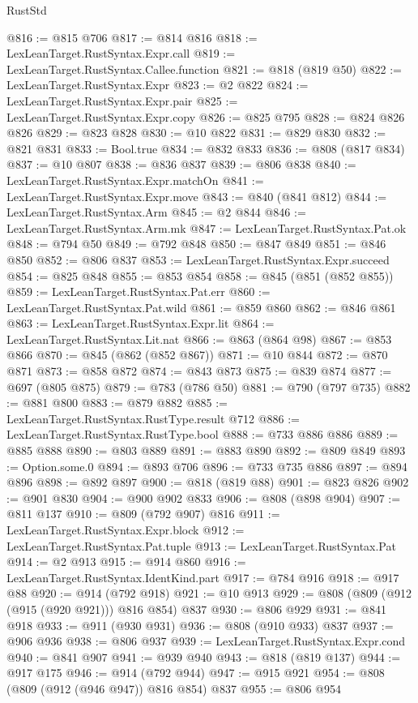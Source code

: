 \begin{lexlean}{RustStd}
\begin{coremodule}
@816 := @815 @706
@817 := @814 @816
@818 := LexLeanTarget.RustSyntax.Expr.call
@819 := LexLeanTarget.RustSyntax.Callee.function
@821 := @818 (@819 @50)
@822 := LexLeanTarget.RustSyntax.Expr
@823 := @2 @822
@824 := LexLeanTarget.RustSyntax.Expr.pair
@825 := LexLeanTarget.RustSyntax.Expr.copy
@826 := @825 @795
@828 := @824 @826 @826
@829 := @823 @828
@830 := @10 @822
@831 := @829 @830
@832 := @821 @831
@833 := Bool.true
@834 := @832 @833
@836 := @808 (@817 @834)
@837 := @10 @807
@838 := @836 @837
@839 := @806 @838
@840 := LexLeanTarget.RustSyntax.Expr.matchOn
@841 := LexLeanTarget.RustSyntax.Expr.move
@843 := @840 (@841 @812)
@844 := LexLeanTarget.RustSyntax.Arm
@845 := @2 @844
@846 := LexLeanTarget.RustSyntax.Arm.mk
@847 := LexLeanTarget.RustSyntax.Pat.ok
@848 := @794 @50
@849 := @792 @848
@850 := @847 @849
@851 := @846 @850
@852 := @806 @837
@853 := LexLeanTarget.RustSyntax.Expr.succeed
@854 := @825 @848
@855 := @853 @854
@858 := @845 (@851 (@852 @855))
@859 := LexLeanTarget.RustSyntax.Pat.err
@860 := LexLeanTarget.RustSyntax.Pat.wild
@861 := @859 @860
@862 := @846 @861
@863 := LexLeanTarget.RustSyntax.Expr.lit
@864 := LexLeanTarget.RustSyntax.Lit.nat
@866 := @863 (@864 @98)
@867 := @853 @866
@870 := @845 (@862 (@852 @867))
@871 := @10 @844
@872 := @870 @871
@873 := @858 @872
@874 := @843 @873
@875 := @839 @874
@877 := @697 (@805 @875)
@879 := @783 (@786 @50)
@881 := @790 (@797 @735)
@882 := @881 @800
@883 := @879 @882
@885 := LexLeanTarget.RustSyntax.RustType.result @712
@886 := LexLeanTarget.RustSyntax.RustType.bool
@888 := @733 @886 @886
@889 := @885 @888
@890 := @803 @889
@891 := @883 @890
@892 := @809 @849
@893 := Option.some.{0}
@894 := @893 @706
@896 := @733 @735 @886
@897 := @894 @896
@898 := @892 @897
@900 := @818 (@819 @88)
@901 := @823 @826
@902 := @901 @830
@904 := @900 @902 @833
@906 := @808 (@898 @904)
@907 := @811 @137
@910 := @809 (@792 @907) @816
@911 := LexLeanTarget.RustSyntax.Expr.block
@912 := LexLeanTarget.RustSyntax.Pat.tuple
@913 := LexLeanTarget.RustSyntax.Pat
@914 := @2 @913
@915 := @914 @860
@916 := LexLeanTarget.RustSyntax.IdentKind.part
@917 := @784 @916
@918 := @917 @88
@920 := @914 (@792 @918)
@921 := @10 @913
@929 := @808 (@809 (@912 (@915 (@920 @921))) @816 @854) @837
@930 := @806 @929
@931 := @841 @918
@933 := @911 (@930 @931)
@936 := @808 (@910 @933) @837
@937 := @906 @936
@938 := @806 @937
@939 := LexLeanTarget.RustSyntax.Expr.cond
@940 := @841 @907
@941 := @939 @940
@943 := @818 (@819 @137)
@944 := @917 @175
@946 := @914 (@792 @944)
@947 := @915 @921
@954 := @808 (@809 (@912 (@946 @947)) @816 @854) @837
@955 := @806 @954

\end{coremodule}
\end{lexlean}
